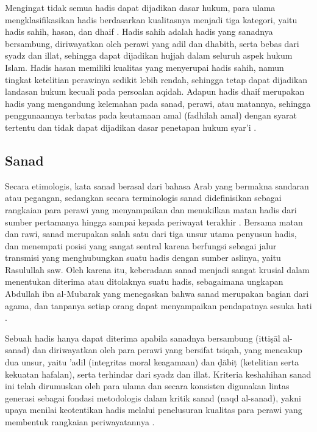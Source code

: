 Mengingat tidak semua hadis dapat dijadikan dasar hukum, para ulama mengklasifikasikan hadis berdasarkan kualitasnya menjadi tiga kategori, yaitu hadis sahih, hasan, dan dhaif \cite{pratiwi2024klasifikasi}. 
Hadis sahih adalah hadis yang sanadnya bersambung, diriwayatkan oleh perawi yang adil dan dhabith, serta bebas dari syadz dan illat, sehingga dapat dijadikan hujjah dalam seluruh aspek hukum Islam. 
Hadis hasan memiliki kualitas yang menyerupai hadis sahih, namun tingkat ketelitian perawinya sedikit lebih rendah, sehingga tetap dapat dijadikan landasan hukum kecuali pada persoalan aqidah. 
Adapun hadis dhaif merupakan hadis yang mengandung kelemahan pada sanad, perawi, atau matannya, sehingga penggunaannya terbatas pada keutamaan amal (fadhilah amal) dengan syarat tertentu dan tidak dapat dijadikan dasar penetapan hukum syar'i \cite{pratiwi2024klasifikasi}.

\subsection{Sanad}
Secara etimologis, kata sanad berasal dari bahasa Arab yang bermakna sandaran atau pegangan, sedangkan secara terminologis sanad didefinisikan sebagai rangkaian para perawi yang menyampaikan dan menukilkan matan hadis dari sumber pertamanya hingga sampai kepada periwayat terakhir \cite{Mustang_Abubakar_2025}. 
Bersama matan dan rawi, sanad merupakan salah satu dari tiga unsur utama penyusun hadis, dan menempati posisi yang sangat sentral karena berfungsi sebagai jalur transmisi yang menghubungkan suatu hadis dengan sumber aslinya, yaitu Rasulullah saw.
Oleh karena itu, keberadaan sanad menjadi sangat krusial dalam menentukan diterima atau ditolaknya suatu hadis, sebagaimana ungkapan Abdullah ibn al-Mubarak yang menegaskan bahwa sanad merupakan bagian dari agama, dan tanpanya setiap orang dapat menyampaikan pendapatnya sesuka hati \cite{Mustang_Abubakar_2025}.

Sebuah hadis hanya dapat diterima apabila sanadnya bersambung (ittiṣāl al-sanad) dan diriwayatkan oleh para perawi yang bersifat tsiqah, yang mencakup dua unsur, yaitu 'adil (integritas moral keagamaan) dan ḍābiṭ (ketelitian serta kekuatan hafalan), serta terhindar dari syadz dan illat. 
Kriteria keshahihan sanad ini telah dirumuskan oleh para ulama dan secara konsisten digunakan lintas generasi sebagai fondasi metodologis dalam kritik sanad (naqd al-sanad), yakni upaya menilai keotentikan hadis melalui penelusuran kualitas para perawi yang membentuk rangkaian periwayatannya \cite{Mustang_Abubakar_2025}.

